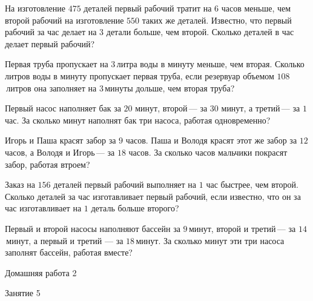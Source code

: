 \begin{class}[number=4]
\begin{listofex}
		\item На изготовление \(475\) деталей первый рабочий тратит на \(6\) часов меньше, чем второй рабочий на изготовление \(550\) таких же деталей. Известно, что первый рабочий за час делает на \(3\) детали больше, чем второй. Сколько деталей в час делает первый рабочий?
		\item Первая труба пропускает на \(3\) литра воды в минуту меньше, чем вторая. Сколько литров воды в минуту пропускает первая труба, если резервуар объемом \(108\) литров она заполняет на \(3\) минуты дольше, чем вторая труба?
		\item Первый насос наполняет бак за \(20\) минут, второй --- за \(30\) минут, а третий --- за \(1\) час. За сколько минут наполнят бак три насоса, работая одновременно?
		\item Игорь и Паша красят забор за \(9\) часов. Паша и Володя красят этот же забор за \(12\) часов, а Володя и Игорь --- за \(18\) часов. За сколько часов мальчики покрасят забор, работая втроем?
		\item Заказ на \(156\) деталей первый рабочий выполняет на \(1\) час быстрее, чем второй. Сколько деталей за час изготавливает первый рабочий, если известно, что он за час изготавливает на \(1\) деталь больше второго?
		\item Первый и второй насосы наполняют бассейн за \(9\) минут, второй и третий --- за \(14\) минут, а первый и третий --- за \(18\) минут. За сколько минут эти три насоса заполнят бассейн, работая вместе?
		
		
		
	\end{listofex}
\end{class}

\begin{homework}[number=2]
	\begin{listofex}
		\item Домашняя работа 2
	\end{listofex}
\end{homework}

\begin{class}[number=5]
	\begin{listofex}
		\item Занятие 5
	\end{listofex}
\end{class}

